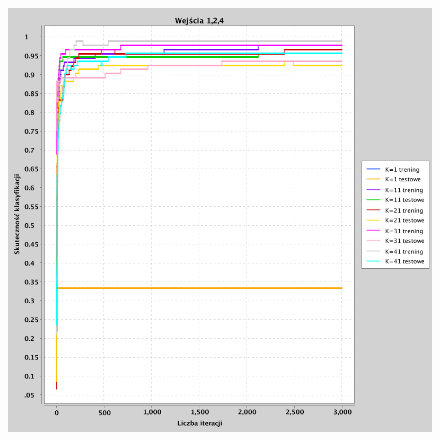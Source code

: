\documentclass[a4paper, portrait,11pt]{article}
\begin{document}
\begin{figure}[!htb]
\begin{minipage}{0.33\textwidth}
    \caption{\label{fig:41_3_1,2,3derivative}}
  \end{minipage}
  \begin{minipage}{0.33\textwidth}
    \centering
    \includegraphics[width=1\linewidth]{../data/classification4/1/derivatives/3_1,2,4.png}
    \caption{\label{fig:41_3_1,2,4derivative}}
  \end{minipage}\hfill
\end{figure}
\end{document}
